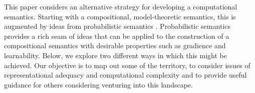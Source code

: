 \documentclass[a4paper,11pt]{article}
\renewcommand{\cite}{\citep}
\theoremstyle{definition}
\newcommand{\hide}[1]{}
\begin{document}
This paper considers an alternative  strategy for developing a computational semantics. Starting with a compositional, model-theoretic semantics, this is augmented by ideas from probabilistic semantics \cite{Gaifman:64,Nilsson:86,Sato:95}. Probabilistic semantics provides a rich seam of ideas that can be applied to the construction of a compositional semantics with desirable properties such as gradience and learnability. Below, we explore two different ways in which this might be achieved. Our objective is to map out some of the territory,  to consider issues of representational adequacy and computational complexity and to provide useful guidance for others considering venturing into this landscape. 


\hide{We show how to compute with both approaches, and show that both are
able to perform learning and inference on small examples. For example,
they can learn that while ``some cats $X$'' entails ``some animals
$X$'', entailment is reversed with other quantifiers: ``no animals
$X$'' entails ``no cats $X$''.}
\end{document}
